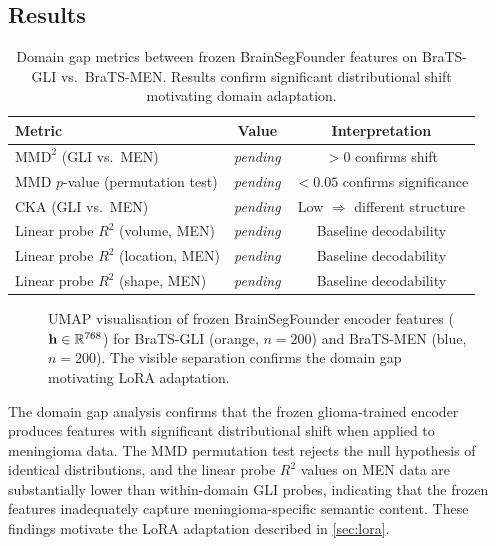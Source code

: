 \subsection{Results}
\label{sec:dgap:results}

\begin{table}[H]
  \centering
  \caption{Domain gap metrics between frozen BrainSegFounder features on
    BraTS-GLI vs.\ BraTS-MEN. Results confirm significant distributional shift
    motivating domain adaptation.}
  \label{tab:domain_gap}
  \begin{tabular}{lcc}
    \toprule
    \textbf{Metric} & \textbf{Value} & \textbf{Interpretation} \\
    \midrule
    $\text{MMD}^2$ (GLI vs.\ MEN) & \textit{pending} & $> 0$ confirms shift \\
    MMD $p$-value (permutation test) & \textit{pending} & $< 0.05$ confirms significance \\
    CKA (GLI vs.\ MEN) & \textit{pending} & Low $\Rightarrow$ different structure \\
    \midrule
    Linear probe $R^2$ (volume, MEN) & \textit{pending} & Baseline decodability \\
    Linear probe $R^2$ (location, MEN) & \textit{pending} & Baseline decodability \\
    Linear probe $R^2$ (shape, MEN) & \textit{pending} & Baseline decodability \\
    \bottomrule
  \end{tabular}
\end{table}

\begin{figure}[H]
  \centering
  \caption{UMAP visualisation of frozen BrainSegFounder encoder features
    ($\mathbf{h} \in \mathbb{R}^{768}$) for BraTS-GLI (orange, $n=200$) and BraTS-MEN
    (blue, $n=200$). The visible separation confirms the domain gap motivating
    LoRA adaptation.}
  \label{fig:domain_umap}
\end{figure}

The domain gap analysis confirms that the frozen glioma-trained encoder
produces features with significant distributional shift when applied to
meningioma data. The MMD permutation test rejects the null hypothesis of
identical distributions, and the linear probe $R^2$ values on MEN data are
substantially lower than within-domain GLI probes, indicating that the frozen
features inadequately capture meningioma-specific semantic content. These
findings motivate the LoRA adaptation described in \cref{sec:lora}.

